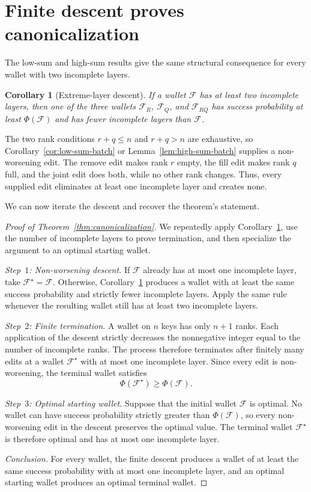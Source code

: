 \documentclass[11pt]{article}
\newtheorem{corollary}[theorem]{Corollary}
\newcommand{\cF}{\ensuremath{\mathcal F}\xspace}
\begin{document}
  \section{Finite descent proves canonicalization}

The low-sum and high-sum results give the same structural consequence for every wallet with two incomplete layers.

\begin{corollary}[Extreme-layer descent]\label{cor:extreme-layer-descent}
If a wallet $\cF$ has at least two incomplete layers, then one of the three wallets $\cF_R$, $\cF_Q$, and $\cF_{RQ}$ has success probability at least $\Phi(\cF)$ and has fewer incomplete layers than $\cF$.
\end{corollary}

The two rank conditions ${r+q\leq n}$ and ${r+q>n}$ are exhaustive, so Corollary~\ref{cor:low-sum-batch} or Lemma~\ref{lem:high-sum-batch} supplies a non-worsening edit.
The remove edit makes rank $r$ empty, the fill edit makes rank $q$ full, and the joint edit does both, while no other rank changes.
Thus, every supplied edit eliminates at least one incomplete layer and creates none.

We can now iterate the descent and recover the theorem's statement.

\begin{proof}[Proof of Theorem~\ref{thm:canonicalization}]
We repeatedly apply Corollary~\ref{cor:extreme-layer-descent}, use the number of incomplete layers to prove termination, and then specialize the argument to an optimal starting wallet.

\emph{Step~$1$: Non-worsening descent.}
If $\cF$ already has at most one incomplete layer, take ${\cF^\star=\cF}$.
Otherwise, Corollary~\ref{cor:extreme-layer-descent} produces a wallet with at least the same success probability and strictly fewer incomplete layers.
Apply the same rule whenever the resulting wallet still has at least two incomplete layers.

\emph{Step~$2$: Finite termination.}
A wallet on $n$ keys has only $n+1$ ranks.
Each application of the descent strictly decreases the nonnegative integer equal to the number of incomplete ranks.
The process therefore terminates after finitely many edits at a wallet $\cF^\star$ with at most one incomplete layer.
Since every edit is non-worsening, the terminal wallet satisfies
\begin{equation*}
\Phi(\cF^\star)\geq\Phi(\cF).
\end{equation*}

\emph{Step~$3$: Optimal starting wallet.}
Suppose that the initial wallet $\cF$ is optimal.
No wallet can have success probability strictly greater than $\Phi(\cF)$, so every non-worsening edit in the descent preserves the optimal value.
The terminal wallet $\cF^\star$ is therefore optimal and has at most one incomplete layer.

\emph{Conclusion.}
For every wallet, the finite descent produces a wallet of at least the same success probability with at most one incomplete layer, and an optimal starting wallet produces an optimal terminal wallet.
\end{proof}
\end{document}
